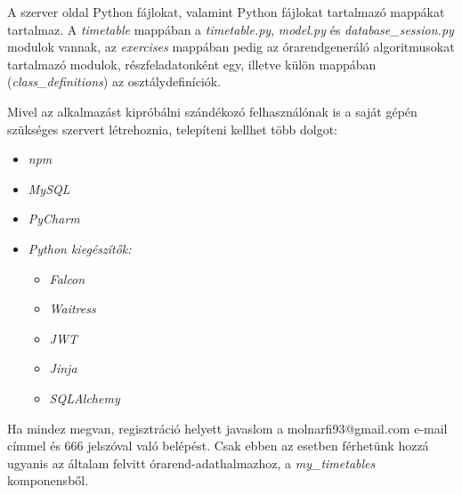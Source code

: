 A szerver oldal Python fájlokat, valamint Python fájlokat tartalmazó mappákat tartalmaz. A \textit{timetable} mappában a \textit{timetable.py}, \textit{model.py} és \textit{database\_session.py} modulok vannak, az \textit{exercises} mappában pedig az órarendgeneráló algoritmusokat tartalmazó modulok, részfeladatonként egy, illetve külön mappában (\textit{class_definitions}) az osztálydefiníciók.

Mivel az alkalmazást kipróbálni szándékozó felhasználónak is a saját gépén szükséges szervert létrehoznia, telepíteni kellhet több dolgot:
\begin{itemize}
	\item \textit{npm}
	\item \textit{MySQL}
	\item \textit{PyCharm}
	\item \textit{Python kiegészítők:}
	\begin{itemize}
		\item \textit{Falcon}
		\item \textit{Waitress}
		\item \textit{JWT}
		\item \textit{Jinja}
		\item \textit{SQLAlchemy}
	\end{itemize}
\end{itemize}

Ha mindez megvan, regisztráció helyett javaslom a molnarfi93@gmail.com e-mail címmel és 666 jelszóval való belépést. Csak ebben az esetben férhetünk hozzá ugyanis az általam felvitt órarend-adathalmazhoz, a \textit{my\_timetables} komponensből.

